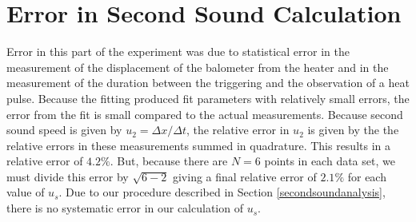 
\section{Error in Second Sound Calculation}\label{errorinsecondsoundcalculation}

Error in this part of the experiment was due to statistical error in the measurement of the displacement of the balometer from the heater and in the measurement of the duration between the triggering and the observation of a heat pulse.  Because the fitting produced fit parameters with relatively small errors, the error from the fit is small compared to the actual measurements.  Because second sound speed is given by $u_{2}=\Delta x/ \Delta t$, the relative error in $u_{2}$ is given by the the relative errors in these measurements summed in quadrature.  This results in a relative error of $4.2\%$.  But, because there are $N=6$ points in each data set, we must divide this error by $\sqrt{6-2}$ giving a final relative error of $2.1\%$ for each value of $u_{s}$.  Due to our procedure described in Section \ref{secondsoundanalysis}, there is no systematic error in our calculation of $u_{s}$.